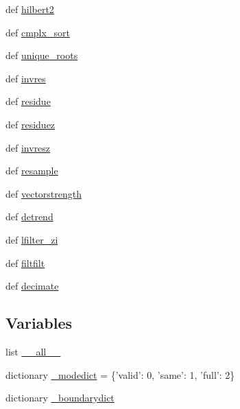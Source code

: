 \begin{DoxyCompactItemize}
def \hyperlink{namespacescipy_1_1signal_1_1signaltools_a58de35cc81197d4561048c5d92b42494}{hilbert2}
\item 
def \hyperlink{namespacescipy_1_1signal_1_1signaltools_a5031cf6249cf88725c8abf39f882330b}{cmplx\+\_\+sort}
\item 
def \hyperlink{namespacescipy_1_1signal_1_1signaltools_aeeb65ce1351c6affe49a763d5a379b13}{unique\+\_\+roots}
\item 
def \hyperlink{namespacescipy_1_1signal_1_1signaltools_a436615752eb389357b2f867a6747132b}{invres}
\item 
def \hyperlink{namespacescipy_1_1signal_1_1signaltools_a0086218fc9eb3a2e760b9444c3db01c8}{residue}
\item 
def \hyperlink{namespacescipy_1_1signal_1_1signaltools_a4c1fd99470212f31ffc65d3123c82b17}{residuez}
\item 
def \hyperlink{namespacescipy_1_1signal_1_1signaltools_a391f209e737d627085823daa4b145d6f}{invresz}
\item 
def \hyperlink{namespacescipy_1_1signal_1_1signaltools_ad7dad116f785f133e775b952dc17ec42}{resample}
\item 
def \hyperlink{namespacescipy_1_1signal_1_1signaltools_a305117d7530b3a0ad64b8c12d3291f69}{vectorstrength}
\item 
def \hyperlink{namespacescipy_1_1signal_1_1signaltools_a6291b0c88f4c89a588ca8cd650fcc7ff}{detrend}
\item 
def \hyperlink{namespacescipy_1_1signal_1_1signaltools_afd0e036099684901ab60fc54f34f20ea}{lfilter\+\_\+zi}
\item 
def \hyperlink{namespacescipy_1_1signal_1_1signaltools_ae981de4498e23cf542fa721f779017db}{filtfilt}
\item 
def \hyperlink{namespacescipy_1_1signal_1_1signaltools_a3e63e0059a3d5e0d9466604c0e127f8f}{decimate}
\end{DoxyCompactItemize}
\subsection*{Variables}
\begin{DoxyCompactItemize}
\item 
list \hyperlink{namespacescipy_1_1signal_1_1signaltools_a18b112c5f3754320389080c509ae3593}{\+\_\+\+\_\+all\+\_\+\+\_\+}
\item 
dictionary \hyperlink{namespacescipy_1_1signal_1_1signaltools_a892a22e92c69038066cb62110ed13dab}{\+\_\+modedict} = \{'valid'\+: 0, 'same'\+: 1, 'full'\+: 2\}
\item 
dictionary \hyperlink{namespacescipy_1_1signal_1_1signaltools_a8dd98af7a22a25e2c10b79108937681e}{\+\_\+boundarydict}
\end{DoxyCompactItemize}


